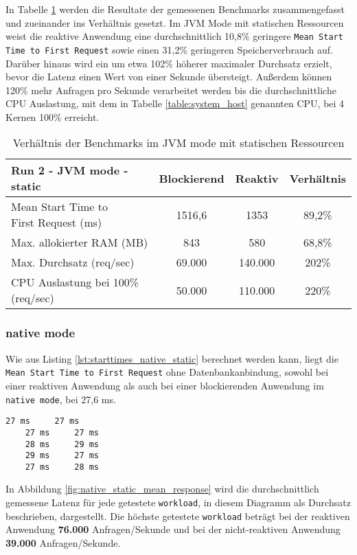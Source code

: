 In Tabelle \ref{table:static_jvm_measurement_results} werden die Resultate der gemessenen Benchmarks zusammengefasst
und zueinander ins Verhältnis gesetzt.
Im JVM Mode mit statischen Ressourcen weist die reaktive Anwendung eine durchschnittlich 10,8\% geringere \verb|Mean Start Time to First Request|
sowie einen 31,2\% geringeren Speicherverbrauch auf.
Darüber hinaus wird ein um etwa 102\% höherer maximaler Durchsatz erzielt, bevor die Latenz einen Wert von einer Sekunde übersteigt.
Außerdem können 120\% mehr Anfragen pro Sekunde verarbeitet werden bis die durchschnittliche CPU Auslastung, mit dem in Tabelle
\ref{table:system_host} genannten CPU, bei 4 Kernen 100\% erreicht.

\begin{table}[ht!]
  \begin{tabular}{|l | c | c | c|}
    \hline
    Run 2 - JVM mode - static & Blockierend & Reaktiv & Verhältnis \\
    \hline
    \makecell[l]{Mean Start Time to                                \\ First Request (ms)} & 1516,6      & 1353  & 89,2\%     \\
    \hline
    Max. allokierter RAM (MB) & 843         & 580     & 68,8\%     \\
    \hline
    Max. Durchsatz (req/sec)  & 69.000      & 140.000 & 202\%      \\
    \hline
    \makecell[l]{CPU Auslastung bei 100\%                          \\ (req/sec)} & 50.000 & 110.000 & 220\%  \\
    \hline
  \end{tabular}
  \caption{Verhältnis der Benchmarks im JVM mode mit statischen Ressourcen}
  \label{table:static_jvm_measurement_results}
\end{table}

\subsubsection{native mode}
\label{subsubsec:static_native_mode}
Wie aus Listing \ref{lst:starttimes_native_static} berechnet werden kann, liegt die \verb|Mean Start Time to First Request|
ohne Datenbankanbindung, sowohl bei einer reaktiven Anwendung als auch bei einer blockierenden
Anwendung im \verb|native mode|, bei 27,6 ms.
\begin{lstlisting}[caption=Startzeiten im native mode mit statischen Ressourcen, captionpos=b, label=lst:starttimes_native_static]
    27 ms     27 ms
    27 ms     27 ms
    28 ms     29 ms
    29 ms     27 ms
    27 ms     28 ms
\end{lstlisting}
In Abbildung \ref{fig:native_static_mean_response} wird die durchschnittlich gemessene Latenz für jede getestete \verb|workload|,
in diesem Diagramm als Durchsatz beschrieben, dargestellt.
Die höchste getestete \verb|workload| beträgt bei der reaktiven Anwendung \textbf{76.000} Anfragen/Sekunde und bei der
nicht-reaktiven Anwendung \textbf{39.000} Anfragen/Sekunde.

